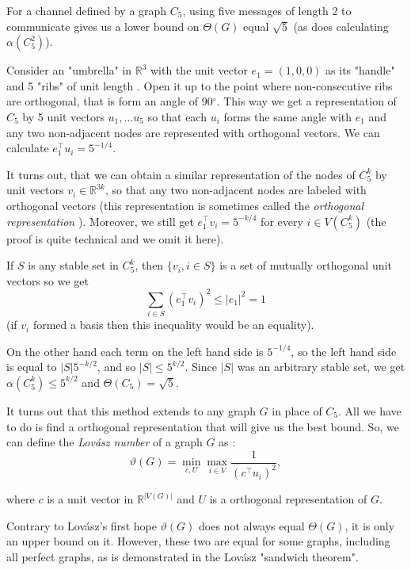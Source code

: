 For a channel defined by a graph $C_5$, using five messages of length 2 to communicate gives us a lower bound on $\Theta(G)$ equal $\sqrt{5}$ (as does calculating $\alpha(C_5^2)$).

Consider an "umbrella" in $\mathbb{R}^3$ with the unit vector $e_1 = (1, 0, 0)$ as its "handle" and 5 "ribs" of unit length . Open it up to the point where non-consecutive ribs are orthogonal, that is form an angle of 90$^\circ$. This way we get a representation of $C_5$ by 5 unit vectors $u_1, \ldots u_5$ so that each $u_i$ forms the same angle with $e_1$ and any two non-adjacent nodes are represented with orthogonal vectors. We can calculate $e_1^\intercal u_i = 5 ^ {-1/4}$.

It turns out, that we can obtain a similar representation of the nodes of $C_5^k$ by unit vectors $v_i \in \mathbb{R}^{3k}$, so that any two non-adjacent nodes are labeled with orthogonal vectors (this representation is sometimes called the \emph{orthogonal representation} \cite{Lovsz1989Orthogonal}). Moreover, we still get $e_1^\intercal v_i = 5^{-k/4}$ for every $i \in V(C_5^k)$ (the proof is quite technical and we omit it here).

If $S$ is any stable set in $C_5^k$, then $\{v_i, i \in S\}$ is a set of mutually orthogonal unit vectors so we get 
$$\sum\limits_{i\in S}(e_1^\intercal v_i)^2 \leq |e_1|^2 = 1$$
(if $v_i$ formed a basis then this inequality would be an equality).

On the other hand each term on the left hand side is $5^{-1/4}$, so the left hand side is equal to $|S|5^{-k/2}$, and so $|S| \leq 5^{k/2}$. Since $|S|$ was an arbitrary stable set, we get $\alpha(C_5^k) \leq 5 ^{k/2}$ and $\Theta(C_5) = \sqrt{5}$.

It turns out that this method extends to any graph $G$ in place of $C_5$. All we have to do is find a orthogonal representation that will give us the best bound. So, we can define the \emph{Lovász number} of a graph $G$ as :
$$\vartheta(G) = \min\limits_{c,U} \max\limits_{i\in V} \frac{1}{(c^\intercal u_i)^2},$$

where $c$ is a unit vector in $\mathbb{R}^{|V(G)|}$ and $U$ is a orthogonal representation of $G$.

Contrary to Lovász's first hope \cite{Lovasz1979} $\vartheta(G)$ does not always equal $\Theta(G)$, it is only an upper bound on it. However, these two are equal for some graphs, including all perfect graphs, as is demonstrated in the Lovász "sandwich theorem".

